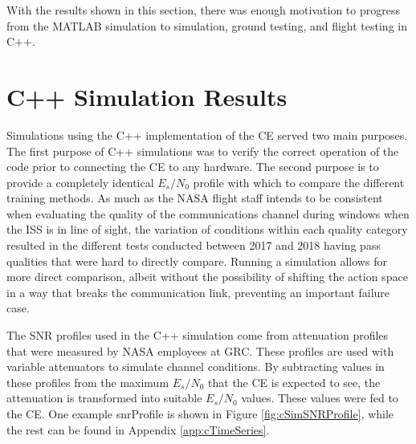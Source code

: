 \par With the results shown in this section, there was enough motivation to progress from the MATLAB simulation to simulation, ground testing, and flight testing in C++.
\FloatBarrier 
\section{C++ Simulation Results}
\par Simulations using the C++ implementation of the CE served two main purposes. The first purpose of C++ simulations was to verify the correct operation of the code prior to connecting the CE to any hardware. The second purpose is to provide a completely identical $E_s/N_0$ profile with which to compare the different training methods. As much as the NASA flight staff intends to be consistent when evaluating the quality of the communications channel during windows when the ISS is in line of sight, the variation of conditions within each quality category resulted in the different tests conducted between 2017 and 2018 having pass qualities that were hard to directly compare. Running a simulation allows for more direct comparison, albeit without the possibility of shifting the action space in a way that breaks the communication link, preventing an important failure case.
\par The SNR profiles used in the C++ simulation come from attenuation profiles that were measured by NASA employees at GRC. These profiles are used with variable attenuators to simulate channel conditions. By subtracting values in these profiles from the maximum $E_s/N_0$ that the CE is expected to see, the attenuation is transformed into suitable $E_s/N_0$ values. These values were fed to the CE. One example snrProfile is shown in Figure \ref{fig:cSimSNRProfile}, while the rest can be found in Appendix \ref{app:cTimeSeries}. 

